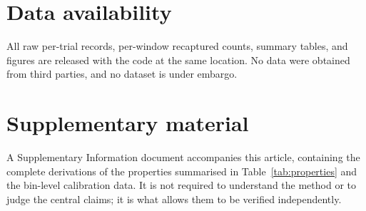 \documentclass[final,5p,times,longtitle]{elsarticle}
\begin{document}
\section*{Data availability}
All raw per-trial records, per-window recaptured counts, summary tables,
and figures are released with the code at the same location. No data were
obtained from third parties, and no dataset is under embargo.

\section*{Supplementary material}
A Supplementary Information document accompanies this article, containing
the complete derivations of the properties summarised in
Table~\ref{tab:properties} and the bin-level calibration data. It is not
required to understand the method or to judge the central claims; it is
what allows them to be verified independently.



\end{document}
